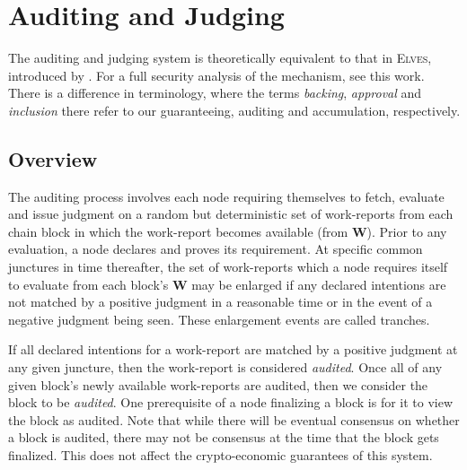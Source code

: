 \section{Auditing and Judging}\label{sec:auditing}

The auditing and judging system is theoretically equivalent to that in \textsc{Elves}, introduced by \cite{cryptoeprint:2024/961}. For a full security analysis of the mechanism, see this work. There is a difference in terminology, where the terms \emph{backing}, \emph{approval} and \emph{inclusion} there refer to our guaranteeing, auditing and accumulation, respectively.


\subsection{Overview}

The auditing process involves each node requiring themselves to fetch, evaluate and issue judgment on a random but deterministic set of work-reports from each \Jam chain block in which the work-report becomes available (\ie from $\mathbf{W}$). Prior to any evaluation, a node declares and proves its requirement. At specific common junctures in time thereafter, the set of work-reports which a node requires itself to evaluate from each block's $\mathbf{W}$ may be enlarged if any declared intentions are not matched by a positive judgment in a reasonable time or in the event of a negative judgment being seen. These enlargement events are called tranches.

If all declared intentions for a work-report are matched by a positive judgment at any given juncture, then the work-report is considered \emph{audited}. Once all of any given block's newly available work-reports are audited, then we consider the block to be \emph{audited}. One prerequisite of a node finalizing a block is for it to view the block as audited. Note that while there will be eventual consensus on whether a block is audited, there may not be consensus at the time that the block gets finalized. This does not affect the crypto-economic guarantees of this system.

